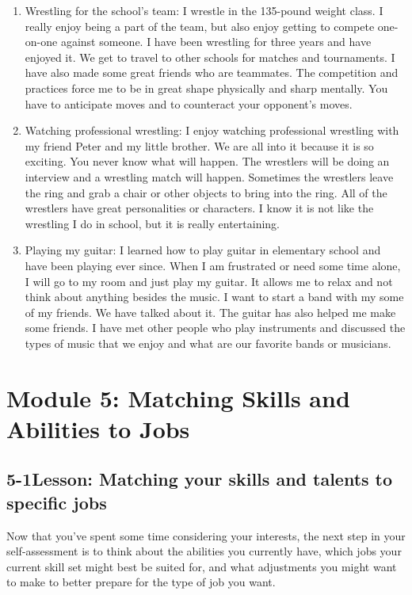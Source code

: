 \begin{enumerate}[leftmargin=1cm]
	\item Wrestling for the school's team: I wrestle in the 135-pound weight class. I really enjoy being a part of the team, but also enjoy getting to compete one-on-one against someone. I have been wrestling for three years and have enjoyed it. We get to travel to other schools for matches and tournaments. I have also made some great friends who are teammates. The competition and practices force me to be in great shape physically and sharp mentally. You have to anticipate moves and to counteract your opponent's moves.
	\item Watching professional wrestling: I enjoy watching professional wrestling with my friend Peter and my little brother. We are all into it because it is so exciting. You never know what will happen. The wrestlers will be doing an interview and a wrestling match will happen. Sometimes the wrestlers leave the ring and grab a chair or other objects to bring into the ring. All of the wrestlers have great personalities or characters. I know it is not like the wrestling I do in school, but it is really entertaining.
	\item Playing my guitar: I learned how to play guitar in elementary school and have been playing ever since. When I am frustrated or need some time alone, I will go to my room and just play my guitar. It allows me to relax and not think about anything besides the music. I want to start a band with my some of my friends. We have talked about it. The guitar has also helped me make some friends. I have met other people who play instruments and discussed the types of music that we enjoy and what are our favorite bands or musicians.
\end{enumerate}

\pagebreak \section*{Module 5:	Matching Skills and Abilities to Jobs}
\noindent\makebox[\textwidth]{\rule{\linewidth}{0.4pt}} 
\localtableofcontents
\noindent\makebox[\textwidth]{\rule{\linewidth}{0.4pt}}


\pagebreak \subsection*{5-1\quad Lesson: Matching your skills and talents to specific jobs}
Now that you've spent some time considering your interests, the next step in your self-assessment is to think about the abilities you currently have, which jobs your current skill set might best be suited for, and what adjustments you might want to make to better prepare for the type of job you want.

